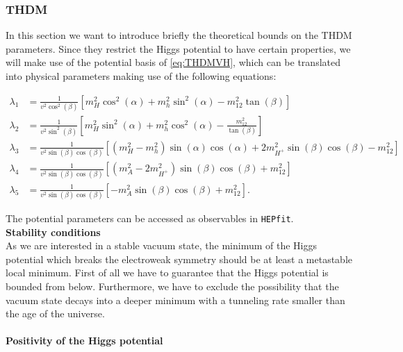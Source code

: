 \documentclass[preprint,3p,12pt]{elsarticle}
\newcommand{\HEPfit}{\texttt{HEPfit}\xspace}
\begin{document}
{\subsubsection{THDM}

In this section we want to introduce briefly the theoretical bounds on the THDM parameters. Since they restrict the Higgs potential to have certain properties, we will make use of the potential basis of \eqref{eq:THDMVH}, which can be translated into physical parameters making use of the following equations:

\begin{align}
 \lambda_1 &=\frac{1}{v^2\cos ^2(\beta)}\left[ m_H^2\cos^2(\alpha) + m_h^2\sin^2(\alpha) - m_{12}^2\tan (\beta)\right] \label{eq:lambda1} \\
 \lambda_2 &=\frac{1}{v^2\sin ^2(\beta)}\left[ m_H^2\sin^2(\alpha) + m_h^2\cos^2(\alpha) - \frac{m_{12}^2}{\tan (\beta)}\right] \label{eq:lambda2} \\
 \lambda_3 &=\frac{1}{v^2\sin(\beta)\cos(\beta)}\left[ \left( m_H^2 - m_h^2\right) \sin(\alpha)\cos(\alpha) + 2m_{H^+}^2\sin(\beta)\cos(\beta) - m_{12}^2\right] \nonumber\\
 \lambda_4 &=\frac{1}{v^2\sin(\beta)\cos(\beta)}\left[ \left( m_A^2 - 2m_{H^+}^2\right) \sin(\beta)\cos(\beta) + m_{12}^2\right] \nonumber\\
 \lambda_5 &=\frac{1}{v^2\sin(\beta)\cos(\beta)}\left[ -m_A^2\sin(\beta)\cos(\beta) + m_{12}^2\right] \nonumber.
\end{align}

The potential parameters can be accessed as observables in \HEPfit.\\

\textbf{Stability conditions}\\

As we are interested in a stable vacuum state, the minimum of the Higgs potential which breaks the electroweak symmetry should be at least a metastable local minimum. First of all we have to guarantee that the Higgs potential is bounded from below. Furthermore, we have to exclude the possibility that the vacuum state decays into a deeper minimum with a tunneling rate smaller than the age of the universe.\\

\paragraph{Positivity of the Higgs potential}

}
\end{document}
